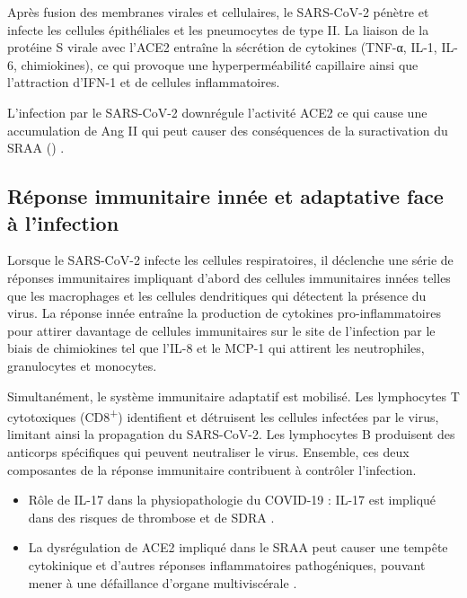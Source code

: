 \documentclass[
  a4paper,
  DIV=11,
  numbers=noendperiod,
  listof=totoc]{scrreprt}
\providecommand{\tightlist}{%
  \setlength{\itemsep}{0pt}\setlength{\parskip}{0pt}}\usepackage{longtable,booktabs,array}
\begin{document}
Après fusion des membranes virales et cellulaires, le SARS-CoV-2 pénètre
et infecte les cellules épithéliales et les pneumocytes de type II. La
liaison de la protéine S virale avec l'\ac{ACE2} entraîne la sécrétion
de cytokines (TNF-α, IL-1, IL-6, chimiokines), ce qui provoque une
hyperperméabilité́ capillaire ainsi que l'attraction d'\ac{IFN-1} et de
cellules inflammatoires.

L'infection par le SARS-CoV-2 downrégule l'activité ACE2 ce qui cause
une accumulation de Ang II qui peut causer des conséquences de la
suractivation du SRAA () \autocite{Mahdavi.2020}.

\subsection{Réponse immunitaire innée et adaptative face à
l'infection}\label{ruxe9ponse-immunitaire-innuxe9e-et-adaptative-face-uxe0-linfection}

Lorsque le SARS-CoV-2 infecte les cellules respiratoires, il déclenche
une série de réponses immunitaires impliquant d'abord des cellules
immunitaires innées telles que les macrophages et les cellules
dendritiques qui détectent la présence du virus. La réponse innée
entraîne la production de cytokines pro-inflammatoires pour attirer
davantage de cellules immunitaires sur le site de l'infection par le
biais de chimiokines tel que l'\ac{IL-8} et le MCP-1 qui attirent les
neutrophiles, granulocytes et monocytes.

Simultanément, le système immunitaire adaptatif est mobilisé. Les
lymphocytes T cytotoxiques (CD8\textsuperscript{+}) identifient et
détruisent les cellules infectées par le virus, limitant ainsi la
propagation du \ac{SARS-CoV-2}. Les lymphocytes B produisent des
anticorps spécifiques qui peuvent neutraliser le virus. Ensemble, ces
deux composantes de la réponse immunitaire contribuent à contrôler
l'infection.

\begin{itemize}
\tightlist
\item
  Rôle de IL-17 dans la physiopathologie du COVID-19 : IL-17 est
  impliqué dans des risques de thrombose et de \ac{SDRA}
  \autocite{Pal.2022}.
\item
  La dysrégulation de ACE2 impliqué dans le SRAA peut causer une tempête
  cytokinique et d'autres réponses inflammatoires pathogéniques, pouvant
  mener à une défaillance d'organe multiviscérale
  \autocite{Argano.2023}.
\end{itemize}
\end{document}
